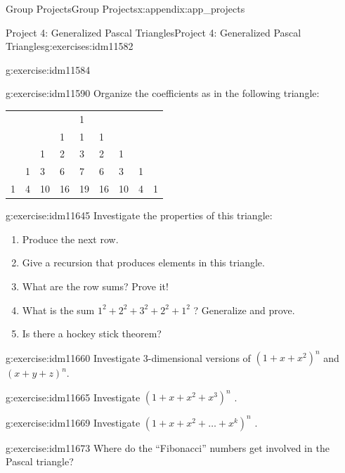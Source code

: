 \documentclass[oneside,10pt,]{book}
\numberwithin{equation}{chapter}
\begin{document}
\begin{appendixptx}{Group Projects}{}{Group Projects}{}{}{x:appendix:app_projects}
\begin{exercises-section-numberless}{Project 4: Generalized Pascal Triangles}{}{Project 4: Generalized Pascal Triangles}{}{}{g:exercises:idm11582}
\begin{divisionexercise}{1}{}{}{g:exercise:idm11584}
\end{divisionexercise}%
\begin{divisionexercise}{2}{}{}{g:exercise:idm11590}%
Organize the coefficients as in the following triangle:%
\begin{sidebyside}{1}{0.1}{0.1}{0}%
\begin{sbspanel}{0.8}%
{\centering%
\begin{tabular}{lllllllll}
&&&&1&&&&\tabularnewline[0pt]
&&&1&1&1&&&\tabularnewline[0pt]
&&1&2&3&2&1&&\tabularnewline[0pt]
&1&3&6&7&6&3&1&\tabularnewline[0pt]
1&4&10&16&19&16&10&4&1
\end{tabular}
\par}
\end{sbspanel}%
\end{sidebyside}%
\end{divisionexercise}%
\begin{divisionexercise}{3}{}{}{g:exercise:idm11645}%
Investigate the properties of this triangle:%
\begin{enumerate}[label=(\alph*)]
\item{}Produce the next row.%
\item{}Give a recursion that produces elements in this triangle.%
\item{}What are the row sums? Prove it!%
\item{}What is the sum \(1^{2} + 2^{2} + 3^{2} + 2^{2} + 1^{2}\) ? Generalize and prove.%
\item{}Is there a hockey stick theorem?%
\end{enumerate}
%
\end{divisionexercise}%
\begin{divisionexercise}{4}{}{}{g:exercise:idm11660}%
Investigate 3-dimensional versions of \(\left( 1 + x + x^{2} \right)^{n}\) and \(\left( x + y + z \right)^{n}.\)%
\end{divisionexercise}%
\begin{divisionexercise}{5}{}{}{g:exercise:idm11665}%
Investigate \(\left( 1 + x + x^{2} + x^{3} \right)^{n}\) .%
\end{divisionexercise}%
\begin{divisionexercise}{6}{}{}{g:exercise:idm11669}%
Investigate \(\left( 1 + x + x^{2} + \ldots + x^{k} \right)^{n}\) .%
\end{divisionexercise}%
\begin{divisionexercise}{7}{}{}{g:exercise:idm11673}%
Where do the ``Fibonacci'' numbers get involved in the Pascal triangle?%
\end{divisionexercise}%

\end{exercises-section-numberless}
\end{appendixptx}
\end{document}
